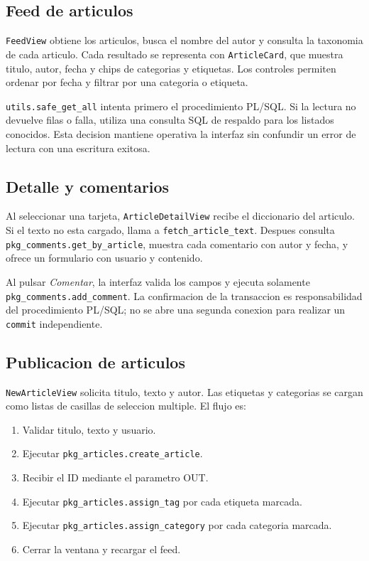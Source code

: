 \documentclass[12pt,a4paper]{article}
\begin{document}
\subsection{Feed de articulos}

\texttt{FeedView} obtiene los articulos, busca el nombre del autor y consulta
la taxonomia de cada articulo. Cada resultado se representa con
\texttt{ArticleCard}, que muestra titulo, autor, fecha y chips de categorias y
etiquetas. Los controles permiten ordenar por fecha y filtrar por una
categoria o etiqueta.

\texttt{utils.safe\_get\_all} intenta primero el procedimiento PL/SQL. Si la
lectura no devuelve filas o falla, utiliza una consulta SQL de respaldo para
los listados conocidos. Esta decision mantiene operativa la interfaz sin
confundir un error de lectura con una escritura exitosa.

\subsection{Detalle y comentarios}

Al seleccionar una tarjeta, \texttt{ArticleDetailView} recibe el diccionario
del articulo. Si el texto no esta cargado, llama a \texttt{fetch\_article\_text}.
Despues consulta \texttt{pkg\_comments.get\_by\_article}, muestra cada
comentario con autor y fecha, y ofrece un formulario con usuario y contenido.

Al pulsar \textit{Comentar}, la interfaz valida los campos y ejecuta solamente
\texttt{pkg\_comments.add\_comment}. La confirmacion de la transaccion es
responsabilidad del procedimiento PL/SQL; no se abre una segunda conexion para
realizar un \texttt{commit} independiente.

\subsection{Publicacion de articulos}

\texttt{NewArticleView} solicita titulo, texto y autor. Las etiquetas y
categorias se cargan como listas de casillas de seleccion multiple. El flujo
es:

\begin{enumerate}
    \item Validar titulo, texto y usuario.
    \item Ejecutar \texttt{pkg\_articles.create\_article}.
    \item Recibir el ID mediante el parametro OUT.
    \item Ejecutar \texttt{pkg\_articles.assign\_tag} por cada etiqueta marcada.
    \item Ejecutar \texttt{pkg\_articles.assign\_category} por cada categoria marcada.
    \item Cerrar la ventana y recargar el feed.
\end{enumerate}
\end{document}
